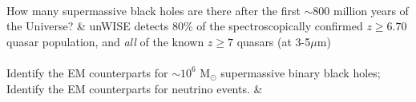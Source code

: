 \begin{tcolorbox}[tab1, tabularx={X  X }, title=Outstanding Issues in Infrared Time Domain Extragalactic Astrophysics, boxrule=1.25pt]
\hline
{}\\
\hline
How many supermassive black holes are there after the first $\sim$800 
million years of the Universe?                                                                                         &      unWISE detects 80\% of the spectroscopically confirmed $z\geq6.70$ quasar population, and {\it all} of the known $z\geq7$ quasars (at 3-5$\mu$m) \\
\\
\hline
Identify the EM counterparts for $\sim10^{6}$ M$_{\odot}$ supermassive 
binary black holes; Identify the EM counterparts for neutrino events.                            &  
\\ 
\end{tcolorbox}
